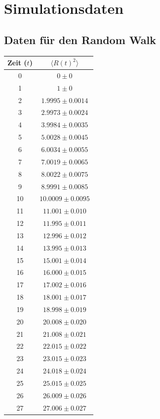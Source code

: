 \documentclass[prb,12pt]{revtex4-2}
\theoremstyle{definition}
\theoremstyle{definition}
\begin{document}
\section{Simulationsdaten}\label{sec:data}
\subsection{Daten für den Random Walk}
\begin{longtable}{cc}
	\toprule
	Zeit ($t$) & $\langle R(t)^2 \rangle $\\\midrule
 0 & $0\pm 0$ \\\midrule
1 & $1\pm 0$ \\\midrule
2 & $1.9995\pm 0.0014$ \\\midrule
3 & $2.9973\pm 0.0024$ \\\midrule
4 & $3.9984\pm 0.0035$ \\\midrule
5 & $5.0028\pm 0.0045$ \\\midrule
6 & $6.0034\pm 0.0055$ \\\midrule
7 & $7.0019\pm 0.0065$ \\\midrule
8 & $8.0022\pm 0.0075$ \\\midrule
9 & $8.9991\pm 0.0085$ \\\midrule
10 & $10.0009\pm 0.0095$ \\\midrule
11 & $11.001\pm 0.010$ \\\midrule
12 & $11.995\pm 0.011$ \\\midrule
13 & $12.996\pm 0.012$ \\\midrule
14 & $13.995\pm 0.013$ \\\midrule
15 & $15.001\pm 0.014$ \\\midrule
16 & $16.000\pm 0.015$ \\\midrule
17 & $17.002\pm 0.016$ \\\midrule
18 & $18.001\pm 0.017$ \\\midrule
19 & $18.998\pm 0.019$ \\\midrule
20 & $20.008\pm 0.020$ \\\midrule
21 & $21.008\pm 0.021$ \\\midrule
22 & $22.015\pm 0.022$ \\\midrule
23 & $23.015\pm 0.023$ \\\midrule
24 & $24.018\pm 0.024$ \\\midrule
25 & $25.015\pm 0.025$ \\\midrule
26 & $26.009\pm 0.026$ \\\midrule
27 & $27.006\pm 0.027$ \\\midrule

\end{longtable}
\end{document}
